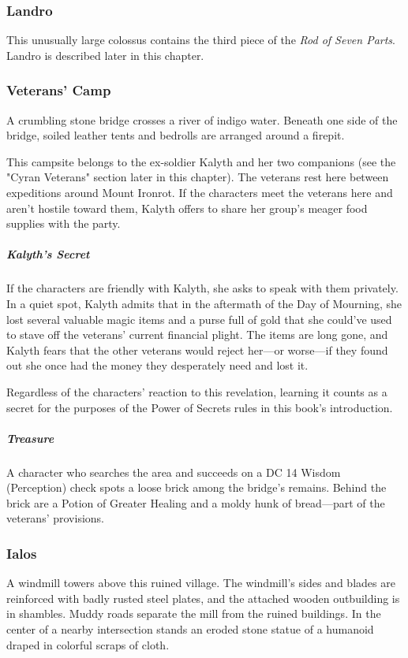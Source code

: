 \documentclass[10pt,a4paper,twoside,bg=print,twocolumn,openany,nodeprecatedcode]{dndbook}
\begin{document}
\subsubsection{Landro}
This unusually large colossus contains the third piece of the \textit{Rod of Seven Parts}. Landro is described later in this chapter.

\subsubsection{Veterans' Camp}
\begin{DndReadAloud}{}
A crumbling stone bridge crosses a river of indigo water. Beneath one side of the bridge, soiled leather tents and bedrolls are arranged around a firepit.

\end{DndReadAloud}

This campsite belongs to the ex-soldier Kalyth and her two companions (see the "Cyran Veterans" section later in this chapter). The veterans rest here between expeditions around Mount Ironrot. If the characters meet the veterans here and aren't hostile toward them, Kalyth offers to share her group's meager food supplies with the party.

\subparagraph{Kalyth's Secret}
If the characters are friendly with Kalyth, she asks to speak with them privately. In a quiet spot, Kalyth admits that in the aftermath of the Day of Mourning, she lost several valuable magic items and a purse full of gold that she could've used to stave off the veterans' current financial plight. The items are long gone, and Kalyth fears that the other veterans would reject her—or worse—if they found out she once had the money they desperately need and lost it.

Regardless of the characters' reaction to this revelation, learning it counts as a secret for the purposes of the Power of Secrets rules in this book's introduction.

\subparagraph{Treasure}
A character who searches the area and succeeds on a DC 14 Wisdom (Perception) check spots a loose brick among the bridge's remains. Behind the brick are a Potion of Greater Healing and a moldy hunk of bread—part of the veterans' provisions.

\subsubsection{Ialos}
\begin{DndReadAloud}{}
A windmill towers above this ruined village. The windmill's sides and blades are reinforced with badly rusted steel plates, and the attached wooden outbuilding is in shambles. Muddy roads separate the mill from the ruined buildings. In the center of a nearby intersection stands an eroded stone statue of a humanoid draped in colorful scraps of cloth.

\end{DndReadAloud}
\end{document}

